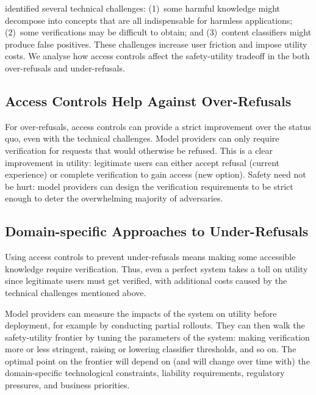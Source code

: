 \documentclass{article}
\theoremstyle{plain}
\theoremstyle{definition}
\theoremstyle{remark}
\begin{document}
 identified several technical challenges: (1)~some harmful knowledge might decompose into concepts that are all indispensable for harmless applications; (2)~some verifications may be difficult to obtain; and (3)~content classifiers might produce false positives.
These challenges increase user friction and impose utility costs.
We analyse how access controls affect the safety-utility tradeoff in the both over-refusals and under-refusals.

\subsection{Access Controls Help Against Over-Refusals}

For over-refusals, access controls can provide a strict improvement over the status quo, even with the technical challenges.
Model providers can only require verification for requests that would otherwise be refused.
This is a clear improvement in utility: legitimate users can either accept refusal (current experience) or complete verification to gain access (new option).
Safety need not be hurt: model providers can design the verification requirements to be strict enough to deter the overwhelming majority of adversaries.

\subsection{Domain-specific Approaches to Under-Refusals}

Using access controls to prevent under-refusals means making some accessible knowledge require verification.
Thus, even a perfect system takes a toll on utility since legitimate users must get verified, with additional costs caused by the technical challenges mentioned above.

Model providers can measure the impacts of the system on utility before deployment, for example by conducting partial rollouts.
They can then walk the safety-utility frontier by tuning the parameters of the system: making verification more or less stringent, raising or lowering classifier thresholds, and so on.
The optimal point on the frontier will depend on (and will change over time with) the domain-specific technological constraints, liability requirements, regulatory pressures, and business priorities.
\end{document}
